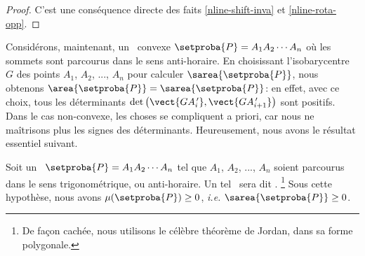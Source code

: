 \begin{proof}
    C'est une conséquence directe des faits \ref{nline-shift-inva} et \ref{nline-rota-opp}.
\end{proof}




Considérons, maintenant, un \ngone\ convexe $\setproba{P} = A_1 A_2 \cdots A_n$ où les sommets sont parcourus dans le sens anti-horaire.
En choisissant l'isobarycentre $G$ des points $A_1$, $A_2$, ..., $A_n$ pour calculer $\sarea{\setproba{P}}$, nous obtenons $\area{\setproba{P}} = \sarea{\setproba{P}}$:
en effet,
avec ce choix, tous les déterminants $\det \big( \vect{G A^{\,\prime}_i} , \vect{G A^{\,\prime}_{i+1}} \big)$ sont positifs.
Dans le cas non-convexe, les choses se compliquent a priori, car nous ne maîtrisons plus les signes des déterminants. Heureusement, nous avons le résultat essentiel suivant.


\begin{fact} \label{route-direction}
    Soit un \ngone\ $\setproba{P} = A_1 A_2 \cdots A_n$ tel que $A_1$, $A_2$, ..., $A_n$ soient parcourus dans le sens trigonométrique, ou anti-horaire.
    Un tel \ngone\ sera dit .%
    \footnote{
    	De façon cachée, nous utilisons le célèbre théorème de Jordan, dans sa forme polygonale.
    }
    Sous cette hypothèse, nous avons 
    $\mu(\setproba{P}) \geq 0$,
    \emph{i.e.}
    $\sarea{\setproba{P}} \geq 0$.
\end{fact}


